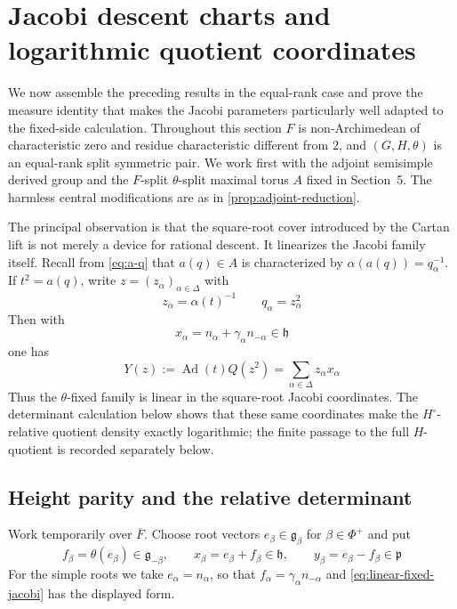 \documentclass[11pt]{amsart}
\theoremstyle{definition}
\theoremstyle{remark}
\newcommand{\Fb}{\overline F}
\newcommand{\Ad}{\operatorname{Ad}}
\newcommand{\g}{\mathfrak g}
\newcommand{\h}{\mathfrak h}
\newcommand{\p}{\mathfrak p}
\begin{document}
\section{Jacobi descent charts and logarithmic quotient coordinates}
\label{sec:jacobi-logarithmic}

We now assemble the preceding results in the equal-rank case and prove the
measure identity that makes the Jacobi parameters particularly well adapted
to the fixed-side calculation.  Throughout this section $F$ is
non-Archimedean of characteristic zero and residue characteristic different
from $2$, and $(G,H,\theta)$ is an equal-rank split symmetric pair.  We work
first with the adjoint semisimple derived group and the $F$-split
$\theta$-split maximal torus $A$ fixed in Section~5.  The harmless central
modifications are as in \cref{prop:adjoint-reduction}.

The principal observation is that the square-root cover introduced by the
Cartan lift is not merely a device for rational descent.  It linearizes the
Jacobi family itself.  Recall from \eqref{eq:a-q} that $a(q)\in A$ is
characterized by $\alpha(a(q))=q_\alpha^{-1}$.  If $t^2=a(q)$, write
$z=(z_\alpha)_{\alpha\in\Delta}$ with
\begin{equation}\label{eq:z-square-root-coordinates}
 z_\alpha=\alpha(t)^{-1}
 \qquad q_\alpha=z_\alpha^2
\end{equation}
Then with
\[
 x_\alpha=n_\alpha+\gamma_\alpha n_{-\alpha}\in\h
\]
one has
\begin{equation}\label{eq:linear-fixed-jacobi}
 Y(z):=\Ad(t)Q(z^2)
 =\sum_{\alpha\in\Delta}z_\alpha x_\alpha
\end{equation}
Thus the $\theta$-fixed family is linear in the square-root Jacobi coordinates.
The determinant calculation below shows that these same coordinates make the
$H^\circ$-relative quotient density exactly logarithmic; the finite passage
to the full $H$-quotient is recorded separately below.

\subsection{Height parity and the relative determinant}

Work temporarily over $\Fb$.  Choose root vectors $e_\beta\in\g_\beta$ for
$\beta\in\Phi^+$ and put
\[
 f_\beta=\theta(e_\beta)\in\g_{-\beta},\qquad
 x_\beta=e_\beta+f_\beta\in\h,\qquad
 y_\beta=e_\beta-f_\beta\in\p
\]
For the simple roots we take $e_\alpha=n_\alpha$, so that
$f_\alpha=\gamma_\alpha n_{-\alpha}$ and \eqref{eq:linear-fixed-jacobi}
has the displayed form.
\end{document}
